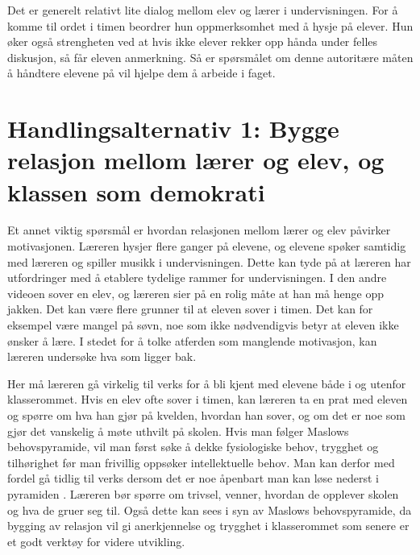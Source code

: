\documentclass[12pt,a4paper]{article}
\begin{document}
Det er generelt relativt lite dialog mellom elev og lærer i undervisningen. For å komme til ordet i timen beordrer hun oppmerksomhet med å hysje på elever. Hun øker også strengheten ved at hvis ikke elever rekker opp hånda under felles diskusjon, så får eleven anmerkning. Så er spørsmålet om denne autoritære måten å håndtere elevene på vil hjelpe dem å arbeide i faget.

\section*{Handlingsalternativ 1: Bygge relasjon mellom lærer og elev, og klassen som demokrati}

Et annet viktig spørsmål er hvordan relasjonen mellom lærer og elev påvirker motivasjonen. Læreren hysjer flere ganger på elevene, og elevene spøker samtidig med læreren og spiller musikk i undervisningen. Dette kan tyde på at læreren har utfordringer med å etablere tydelige rammer for undervisningen. I den andre videoen sover en elev, og læreren sier på en rolig måte at han må henge opp jakken. Det kan være flere grunner til at eleven sover i timen. Det kan for eksempel være mangel på søvn, noe som ikke nødvendigvis betyr at eleven ikke ønsker å lære. I stedet for å tolke atferden som manglende motivasjon, kan læreren undersøke hva som ligger bak. 

Her må læreren gå virkelig til verks for å bli kjent med elevene både i og utenfor klasserommet. Hvis en elev ofte sover i timen, kan læreren ta en prat med eleven og spørre om hva han gjør på kvelden, hvordan han sover, og om det er noe som gjør det vanskelig å møte uthvilt på skolen. 
Hvis man følger Maslows behovspyramide, vil man først søke å dekke fysiologiske behov, trygghet og tilhørighet før man frivillig oppsøker intellektuelle behov. Man kan derfor med fordel gå tidlig til verks dersom det er noe åpenbart man kan løse
nederst i pyramiden \parencite{skaalvik2021skolen}. Læreren bør spørre om trivsel, venner, hvordan de opplever skolen og hva de gruer seg til.  Også dette kan sees i syn av Maslows behovspyramide, da bygging av relasjon vil gi anerkjennelse og trygghet i klasserommet som senere er et godt verktøy for videre utvikling.
\end{document}

